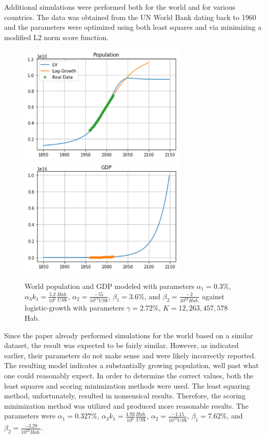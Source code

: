 \documentclass[a4paper]{article}
\begin{document}
Additional simulations were performed both for the world and for various countries. The data was obtained from the UN World Bank dating back to 1960 and the parameters were optimized using both least squares and via minimizing a modified L2 norm score function.

\begin{figure}[t!]
\includegraphics[width=80mm]{images/world-pop.png}
\includegraphics[width=80mm]{images/world-gdp.png}
\caption{World population and GDP modeled with parameters  $\alpha_1 = 0.3\%$, $\alpha_3 k_1 = \frac{5.2}{10^{6}}\frac{Hab.}{US \$}$, $\alpha_2 = \frac{-55}{10^{17} US\$}$, $\beta_1 = 3.6\%$, and $\beta_2 = \frac{-2}{10^{22} Hab.}$ against logistic-growth with parameters  $\gamma = 2.72\%$, $K = 12,263,457,578 $ Hab. \label{overflow}}
\end{figure}

Since the paper already performed simulations for the world based on a similar dataset, the result was expected to be fairly similar. However, as indicated earlier, their parameters do not make sense and were likely incorrectly reported. The resulting model indicates a substantially growing population, well past what one could reasonably expect. In order to determine the correct values, both the least squares and scoring minimization methods were used. The least squaring method, unfortunately, resulted in nonsensical results. Therefore, the scoring minimization method was utilized and produced more reasonable results. The parameters were $\alpha_1 =0.327\%$, $\alpha_3 k_1 = \frac{4.93}{10^6} \frac{Hab.}{US \$}$, $\alpha_2 = \frac{-1.15}{10^{16} US \$}$, $\beta_1 = 7.62\%$, and $\beta_2 = \frac{-3.29}{10^{22} Hab.}$.
\end{document}
